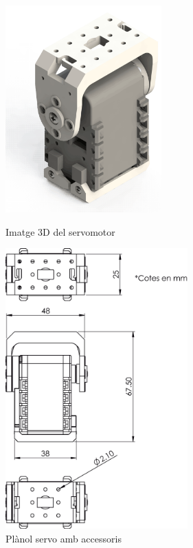 \begin{figure}[h!]
\centering
\begin{minipage}[b]{0.45\linewidth}
\centering
\includegraphics[width=6cm]{./imgComp/servo}
\caption{Imatge 3D del servomotor}
\end{minipage}
\begin{minipage}[b]{0.45\linewidth}
\centering
\includegraphics[width=7cm]{./sketch/servo}
\caption{Plànol servo amb accessoris}
\end{minipage}
\end{figure}

